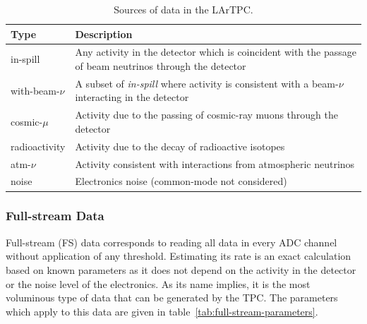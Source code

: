 \begin{table}[ht!]
	\centering
	\begin{tabular}{| p{1in} | p{4.5in} |}
		\hline
	\textbf{Type} & \textbf{Description} \\ \hline
		
	in-spill & Any activity in the detector which is coincident with
	the passage of beam neutrinos through the detector \\ \hline
	
	with-beam-$\nu$ & A subset of \textit{in-spill} where activity is
	consistent with a beam-$\nu$ interacting in the detector \\ \hline
	
	cosmic-$\mu$ & Activity due to the passing of cosmic-ray muons
	through the detector \\ \hline
	
	radioactivity & Activity due to the decay of radioactive
	isotopes \\ \hline
	
	atm-$\nu$ & Activity consistent with interactions from
	atmospheric neutrinos \\ \hline
	
	noise & Electronics noise (common-mode not considered) \\ \hline

	\end{tabular}
	\caption{Sources of data in the LArTPC.}
	\label{tab:dune-data-sources}
\end{table}



%

\subsubsection{Full-stream Data}

Full-stream (FS) data corresponds to reading all data in every ADC channel without
application of any threshold. Estimating its rate is an exact calculation based on
known parameters as it does not depend on the activity in the detector or the noise
level of the electronics. As its name implies, it is the most voluminous type of data
that can be generated by the TPC. The parameters which apply to this data are given in
table~\ref{tab:full-stream-parameters}.

